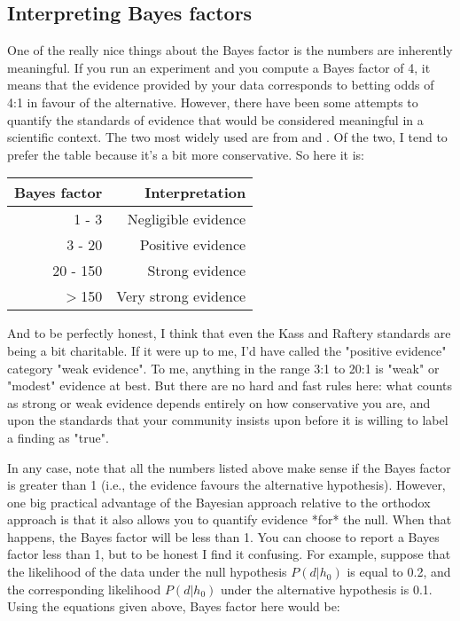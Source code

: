 \subsection{Interpreting Bayes factors}

One of the really nice things about the Bayes factor is the numbers are inherently meaningful. If you run an experiment and you compute a Bayes factor of 4, it means that the evidence provided by your data corresponds to betting odds of 4:1 in favour of the alternative. However, there have been some attempts to quantify the standards of evidence that would be considered meaningful in a scientific context. The two most widely used are from  and . Of the two, I tend to prefer the  table because it's a bit more conservative. So here it is:

\begin{center}
\begin{tabular}{r|r}
Bayes factor & Interpretation \\ \hline
1 - 3 & Negligible evidence \\
3 - 20 & Positive evidence \\
20 - 150 & Strong evidence \\
$>$150 & Very strong evidence
\end{tabular}
\end{center} 


And to be perfectly honest, I think that even the Kass and Raftery standards are being a bit charitable. If it were up to me, I'd have called the "positive evidence" category "weak evidence". To me, anything in the range 3:1 to 20:1 is "weak" or "modest" evidence at best. But there are no hard and fast rules here: what counts as strong or weak evidence depends entirely on how conservative you are, and upon the standards that your community insists upon before it is willing to label a finding as "true". 

In any case, note that all the numbers listed above make sense if the Bayes factor is greater than 1 (i.e., the evidence favours the alternative hypothesis). However, one big practical advantage of the Bayesian approach relative to the orthodox approach is that it also allows you to quantify evidence *for* the null. When that happens, the Bayes factor will be less than 1. You can choose to report a Bayes factor less than 1, but to be honest I find it confusing. For example, suppose that the likelihood of the data under the null hypothesis $P(d|h_0)$ is equal to 0.2, and the corresponding likelihood $P(d|h_0)$ under the alternative hypothesis is 0.1. Using the equations given above,  Bayes factor here would be:

